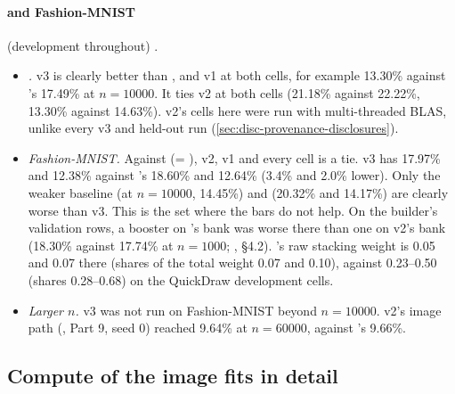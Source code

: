 \paragraph{ and Fashion-MNIST} (development throughout) .
\begin{itemize}
\item \emph{.} v3 is clearly better than ,  and v1 at both cells, for example 13.30\% against 's 17.49\% at $n=10000$. It ties v2 at both cells (21.18\% against 22.22\%, 13.30\% against 14.63\%). v2's cells here were run with multi-threaded BLAS, unlike every v3 and held-out run (\cref{sec:disc-provenance-disclosures}).
\item \emph{Fashion-MNIST.} Against  (= ), v2, v1 and  every cell is a tie. v3 has 17.97\% and 12.38\% against 's 18.60\% and 12.64\% (3.4\% and 2.0\% lower). Only the weaker baseline  (at $n=10000$, 14.45\%) and  (20.32\% and 14.17\%) are clearly worse than v3. This is the set where the bars do not help. On the builder's validation rows, a booster on 's bank was worse there than one on v2's bank (18.30\% against 17.74\% at $n=1000$; , \S4.2). 's raw stacking weight is 0.05 and 0.07 there (shares of the total weight 0.07 and 0.10), against 0.23--0.50 (shares 0.28--0.68) on the QuickDraw development cells.
\item \emph{Larger $n$.} v3 was not run on Fashion-MNIST beyond $n=10000$. v2's image path (, Part 9, seed 0) reached 9.64\% at $n=60000$, against 's 9.66\%.
\end{itemize}

\subsection{Compute of the image fits in detail}\label{app:further-compute}

